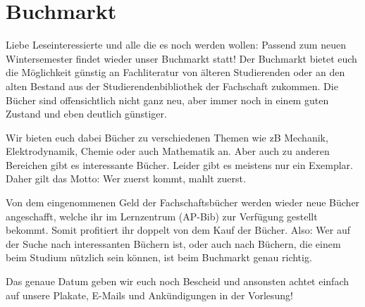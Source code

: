 \vspace{-5ex}
\section{Buchmarkt}
\begin{multicols*}{2}
\begin{wrapfigure}[12]{r}{0cm}
\end{wrapfigure}
Liebe Leseinteressierte und alle die es noch werden wollen: Passend zum neuen Wintersemester findet wieder unser Buchmarkt statt! Der Buchmarkt bietet euch die Möglichkeit günstig an Fachliteratur von älteren Studierenden oder an den alten Bestand aus der Studierendenbibliothek der Fachschaft zukommen. Die Bücher sind offensichtlich nicht ganz neu, aber immer noch in einem guten Zustand und eben deutlich günstiger. 

Wir bieten euch dabei Bücher zu verschiedenen Themen wie zB Mechanik, Elektrodynamik, Chemie oder auch Mathematik an. Aber auch zu anderen Bereichen gibt es interessante Bücher. Leider gibt es meistens nur ein Exemplar. Daher gilt das Motto: Wer zuerst kommt, mahlt zuerst. 

Von dem eingenommenen Geld der Fachschaftsbücher werden wieder neue Bücher angeschafft, welche ihr im Lernzentrum (AP-Bib) zur Verfügung gestellt bekommt. Somit profitiert ihr doppelt von dem Kauf der Bücher. Also: Wer auf der Suche nach interessanten Büchern ist, oder auch nach Büchern, die einem beim Studium nützlich sein können, ist beim Buchmarkt genau richtig.

Das genaue Datum geben wir euch noch Bescheid und ansonsten achtet einfach auf unsere Plakate, E-Mails und Ankündigungen in der Vorlesung!

\end{multicols*}

